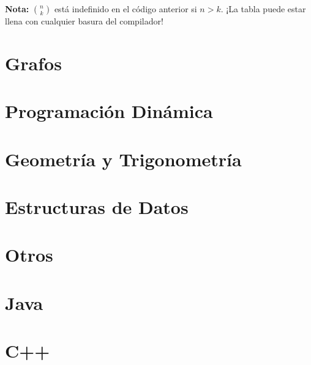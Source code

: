 \documentclass[10pt,letterpaper]{article}
\begin{document}

\bigskip 
\textbf{Nota:} $ \displaystyle {n \choose k }  $ está indefinido en el código anterior si $ n > k$. ¡La tabla puede estar llena con cualquier basura del compilador!

\section{Grafos}
\section{Programación Dinámica}
\section{Geometría y Trigonometría}
\section{Estructuras de Datos}
\section{Otros}
\section{Java}
\section{C++}
\end{document}
